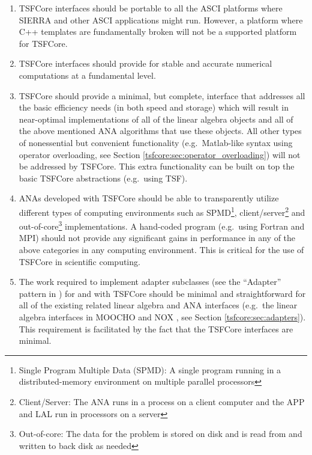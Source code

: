 \begin{enumerate}

\item
TSFCore interfaces should be portable to all the ASCI
{}\cite{ref:doe_asci} platforms where SIERRA {}\cite{ref:SIERRA} and
other ASCI applications might run.  However, a platform where C++
templates are fundamentally broken will not be a supported platform
for TSFCore.

\item
TSFCore interfaces should provide for stable and accurate numerical
computations at a fundamental level.

\item
TSFCore should provide a minimal, but complete, interface that
addresses all the basic efficiency needs (in both speed and storage)
which will result in near-optimal implementations of all of the linear
algebra objects and all of the above mentioned ANA algorithms that use
these objects.  All other types of nonessential but convenient
functionality (e.g.~Matlab-like syntax using operator overloading, see
Section {}\ref{tsfcore:sec:operator_overloading}) will not be
addressed by TSFCore.  This extra functionality can be built on top
the basic TSFCore abstractions (e.g.~using TSF).

\item
ANAs developed with TSFCore should be able to transparently utilize
different types of computing environments such as SPMD\footnote{Single
Program Multiple Data (SPMD): A single program running in a
distributed-memory environment on multiple parallel processors},
client/server\footnote{Client/Server: The ANA runs in a process on a
client computer and the APP and LAL run in processors on a server} and
out-of-core\footnote{Out-of-core: The data for the problem is stored
on disk and is read from and written to back disk as needed}
implementations.  A hand-coded program (e.g.~using Fortran and MPI)
should not provide any significant gains in performance in any of the
above categories in any computing environment.  This is critical for
the use of TSFCore in scientific computing.

\item
The work required to implement adapter subclasses (see the ``Adapter''
pattern in {}\cite{ref:gama_et_al_1995}) for and with TSFCore should
be minimal and straightforward for all of the existing related linear
algebra and ANA interfaces (e.g.~the linear algebra interfaces in
MOOCHO {}\cite{ref:moochouserguide} and NOX {}\cite{ref:nox}, see
Section {}\ref{tsfcore:sec:adapters}).  This requirement is
facilitated by the fact that the TSFCore interfaces are minimal.

\end{enumerate}

